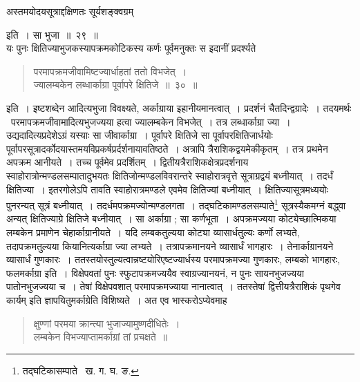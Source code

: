 \documentclass[11pt, openany]{book}
\begin{document}
\begin{center}
{\qt अस्तमयोदयसूत्राद्दक्षिणतः सूर्यशङ्क्वग्रम्} 
\end{center}
इति~। सा भुजा~॥~२९~॥ \\

\indent यः पुनः क्षितिज्याभुजकस्यापक्रमकोटिकस्य कर्णः पूर्वमनुक्तः स इदानीं प्रदर्श्यते\textendash 
\begin{quote}
{\ab परमापक्रमजीवामिष्टज्यार्धाहतां ततो विभजेत्~।\\
 ज्यालम्बकेन लब्धार्काग्रा पूर्वापरे क्षितिजे~॥~३०~॥} 
\end{quote}

\newpage

\indent इति~। इष्टशब्देन आदित्यभुजा विवक्ष्यते, अर्काग्राया इहानीयमानत्वात्~। प्रदर्शनं चैतदिन्द्वग्रादेः~। तदयमर्थः \textendash\ 
परमापक्रमजीवामादित्यभुजज्यया हत्वा ज्यालम्बकेन विभजेत्~। तत्र लब्धार्काग्रा ज्या~। उद्यदादित्यप्रदेशेऽग्रं यस्याः सा जीवार्काग्रा~। पूर्वापरे क्षितिजे सा पूर्वापरक्षितिजार्धयोः पूर्वापरसूत्रादर्कोदयास्तमयविप्रकर्षप्रर्दर्शनायावतिष्ठते~। अत्रापि त्रैराशिकद्वयमेकीकृतम्~। तत्र प्रथमेन अपक्रम आनीयते~। तच्च पूर्वमेव प्रदर्शितम्~। द्वितीयत्रैराशिकक्षेत्रप्रदर्शनाय स्वाहोरात्रोन्मण्डलसम्पातादुभयतः क्षितिजोन्मण्डलविवरान्तरे स्वाहोरात्रवृत्ते
सूत्राग्रद्वयं बध्नीयात्~। तदर्धं क्षितिज्या~। इतरगोलेऽपि तावति स्वाहोरात्रमण्डले एवमेव क्षितिज्यां बध्नीयात्~। क्षितिज्यासूत्रमध्ययोः पुनरन्यत् सूत्रं बध्नीयात्~। तदर्धमपक्रमज्योन्मण्डलगता~। तद्घटिकामण्डलसम्पाते\renewcommand{\thefootnote}{१}\footnote{तद्घटिकासम्पाते \textendash\ ख. ग. घ. ङ.} सूत्रस्यैकमग्नं बद्ध्वा अन्यत् क्षितिज्याग्रे क्षितिजे बध्नीयात्~। सा अर्काग्रा ; सा कर्णभूता~। अपक्रमज्यया कोट्येच्छात्मिकया लम्बकेन प्रमाणेन चेहार्काग्रानीयते~। यदि लम्बकतुल्यया कोट्या व्यासार्धतुल्यः कर्णो लभ्यते, तदापक्रमतुल्यया कियानित्यर्काग्रा ज्या लभ्यते~। तत्रापक्रमानयने व्यासार्धं भागहारः~। तेनार्काग्रानयने व्यासार्धं गुणकारः~। 
ततस्तयोस्तुल्यत्वान्नष्टयोरिएष्टज्यार्धस्य परमापक्रमज्या गुणकारः, लम्बको भागहारः, फलमर्काग्रा इति~। विक्षेपवतां पुनः स्फुटापक्रमज्ययैव
स्वाग्रज्यानयनं, न पुनः सायनभुजज्यया पातोनभुजज्यया च~। तेषां विक्षेपवशात् परमापक्रमज्याया नानात्वात्~। ततस्तेषां
द्वित्तीयत्रैराशिकं पृथगेव कार्यम् इति ज्ञापयितुमर्काग्रेति विशिष्यते~। अत एव भास्करोऽप्येवमाह\textendash
 
\begin{quote}
{\qt क्षुण्णां परमया क्रान्त्या भुजाज्यामुष्णदीधितेः~। \\
     लम्बकेन विभज्याप्तामर्काग्रां तां प्रचक्षते~॥} 
\end{quote}
\end{document}
